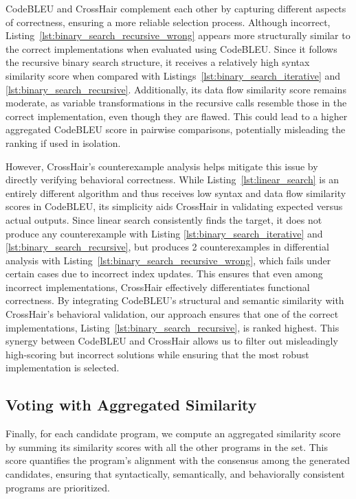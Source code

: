 \documentclass{article}
\begin{document}
CodeBLEU and CrossHair complement each other by capturing different aspects of correctness, ensuring a more reliable selection process. Although incorrect, Listing~\ref{lst:binary_search_recursive_wrong} appears more structurally similar to the correct implementations when evaluated using CodeBLEU. Since it follows the recursive binary search structure, it receives a relatively high syntax similarity score when compared with Listings~\ref{lst:binary_search_iterative} and \ref{lst:binary_search_recursive}. Additionally, its data flow similarity score remains moderate, as variable transformations in the recursive calls resemble those in the correct implementation, even though they are flawed. This could lead to a higher aggregated CodeBLEU score in pairwise comparisons, potentially misleading the ranking if used in isolation.

However, CrossHair's counterexample analysis helps mitigate this issue by directly verifying behavioral correctness. While Listing~\ref{lst:linear_search} is an entirely different algorithm and thus receives low syntax and data flow similarity scores in CodeBLEU, its simplicity aids CrossHair in validating expected versus actual outputs. Since linear search consistently finds the target, it does not produce any counterexample with Listing \ref{lst:binary_search_iterative} and \ref{lst:binary_search_recursive}, but produces 2 counterexamples in differential analysis with Listing~\ref{lst:binary_search_recursive_wrong}, which fails under certain cases due to incorrect index updates.  This ensures that even among incorrect implementations, CrossHair effectively differentiates functional correctness.
By integrating CodeBLEU’s structural and semantic similarity with CrossHair’s behavioral validation, our approach ensures that one of the correct implementations, Listing~\ref{lst:binary_search_recursive}, is ranked highest. This synergy between CodeBLEU and CrossHair allows us to filter out misleadingly high-scoring but incorrect solutions while ensuring that the most robust implementation is selected.

\subsection{Voting with Aggregated Similarity}

Finally, for each candidate program, we compute an aggregated similarity score by summing its similarity scores with all the other programs in the set. This score quantifies the program’s alignment with the consensus among the generated candidates, ensuring that syntactically, semantically, and behaviorally consistent programs are prioritized. 
\end{document}
